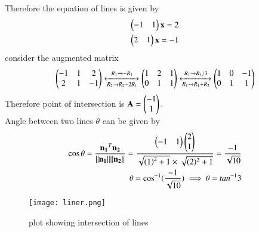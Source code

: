 \documentclass[journal,12pt,twocolumn]{IEEEtran}
\begin{document}
Therefore the equation of lines is given by 
\begin{align}
\begin{pmatrix}-1&1\end{pmatrix}\mathbf{x}=2\\
\begin{pmatrix}2&1\end{pmatrix}\mathbf{x}=-1
\end{align}
consider the augmented matrix
\begin{align}
\begin{pmatrix}-1&1&2\\2&1&-1\end{pmatrix}
\xleftrightarrow[R_2\rightarrow R_2-2R_1]{R_1\rightarrow -R_1}
\begin{pmatrix}1&2&1\\0&1&1\end{pmatrix}\xleftrightarrow[R_1\rightarrow R_1+R_2]{R_1\rightarrow R_1/3}
\begin{pmatrix}1&0&-1\\0&1&1\end{pmatrix}
\end{align}
Therefore point of intersection is $\mathbf{A}=\begin{pmatrix}-1\\1\end{pmatrix}.$
\\
Angle between two lines $\theta$ can be given by
\begin{align}
\cos\theta =\frac{\mathbf{n_1}^T\mathbf{n_2}}{\lVert\mathbf{n_1}\rVert\lVert\mathbf{n_2}\rVert}=
\frac{\begin{pmatrix}-1&1\end{pmatrix}\begin{pmatrix}2\\1\end{pmatrix}}{\sqrt{\left(1\right)^2 +1} \times \sqrt{(2)^2 +1}}=\frac{-1}{\sqrt{10}}\\
\theta = \cos^{-1}(\frac{-1}{\sqrt{10}})\implies \theta = tan^{-1}3
\end{align}
\begin{figure}[!ht]
\centering
\texttt{[image: liner.png]}
\caption{plot showing intersection of lines}
\label{Fig}
\end{figure}
\end{document}

